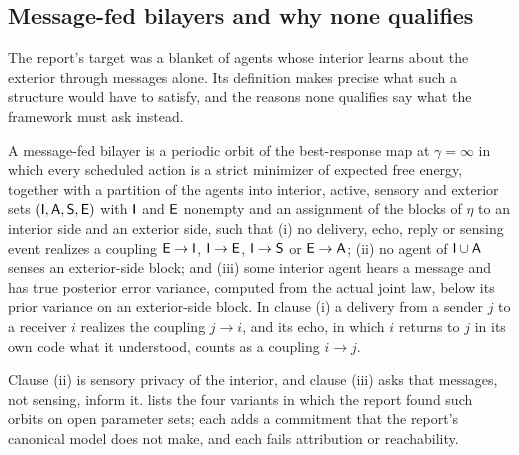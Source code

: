 \subsection{Message-fed bilayers and why none qualifies}\label{sec:min-bilayers}

The report's target was a blanket of agents whose interior learns about the exterior through messages alone. Its definition makes precise what such a structure would have to satisfy, and the reasons none qualifies say what the framework must ask instead.

\begin{definition}\label{def:min-bilayer}
A message-fed bilayer is a periodic orbit of the best-response map at $\gamma=\infty$ in which every scheduled action is a strict minimizer of expected free energy, together with a partition of the agents into interior, active, sensory and exterior sets $(\mathsf{I},\mathsf{A},\mathsf{S},\mathsf{E})$ with $\mathsf{I}$ and $\mathsf{E}$ nonempty and an assignment of the blocks of $\eta$ to an interior side and an exterior side, such that (i) no delivery, echo, reply or sensing event realizes a coupling $\mathsf{E}\to\mathsf{I}$, $\mathsf{I}\to\mathsf{E}$, $\mathsf{I}\to\mathsf{S}$ or $\mathsf{E}\to\mathsf{A}$; (ii) no agent of $\mathsf{I}\cup\mathsf{A}$ senses an exterior-side block; and (iii) some interior agent hears a message and has true posterior error variance, computed from the actual joint law, below its prior variance on an exterior-side block. In clause (i) a delivery from a sender $j$ to a receiver $i$ realizes the coupling $j\to i$, and its echo, in which $i$ returns to $j$ in its own code what it understood, counts as a coupling $i\to j$.
\end{definition}

Clause (ii) is sensory privacy of the interior, and clause (iii) asks that messages, not sensing, inform it.  lists the four variants in which the report found such orbits on open parameter sets; each adds a commitment that the report's canonical model does not make, and each fails attribution or reachability.

